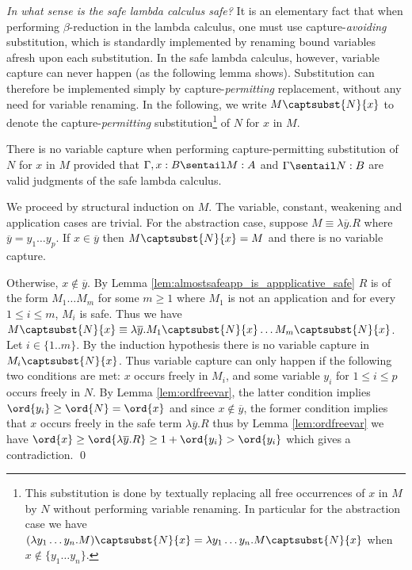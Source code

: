 \emph{In what sense is the safe lambda calculus safe?} It is an
elementary fact that when performing $\beta$-reduction in the lambda
calculus, one must use capture-\emph{avoiding} substitution, which
is standardly implemented by renaming bound variables afresh upon
each substitution. In the safe lambda calculus, however, variable
capture can never happen (as the following lemma shows).
Substitution can therefore be implemented simply by
capture-\emph{permitting} replacement, without any need for variable
renaming. In the following, we write $M\captsubst{N}{x}$ to denote
the capture-\emph{permitting} substitution\footnote{This
substitution is done by textually replacing all free occurrences of
$x$ in $M$ by $N$ without performing variable renaming.  In
particular for the abstraction
  case we have
$(\lambda y_1\ldots y_n . M)\captsubst{N}{x} = \lambda y_1\ldots y_n . M\captsubst{N}{x}$ when $x\not\in
  \{ y_1\ldots y_n \}$.}
of $N$ for $x$ in $M$.

\begin{lemma}\label{lem:nvc}
\label{lem:nocapture} There is no variable capture when performing
capture-permitting substitution of $N$ for $x$ in $M$ provided that
$\Gamma, x:B \sentail M : A$ and $\Gamma \sentail  N : B$ are valid
judgments of the safe lambda calculus.
\end{lemma}

\proof
  We proceed by structural induction on $M$. The variable, constant, weakening and
  application cases are trivial. For the abstraction case, suppose $M \equiv \lambda \overline{y}. R$ where $\overline{y} = y_1 \ldots y_p$. If $x \in \overline{y}$ then $M \captsubst{N}{x} = M$ and there is no variable capture.

 Otherwise, $x \not\in \overline{y}$. By Lemma \ref{lem:almostsafeapp_is_appplicative_safe} $R$ is of the
  form $M_1 \ldots M_m$ for some $m\geq 1$ where $M_1$ is not an application and for every $1 \leq i\leq m$, $M_i$ is safe.
 Thus we have $M \captsubst{N}{x} \equiv \lambda \overline{y} . M_1 \captsubst{N}{x} \ldots M_m \captsubst{N}{x}$.  Let $i\in\{1..m\}$. By the induction hypothesis there is no variable capture in $M_i \captsubst{N}{x}$.  Thus variable capture can only happen if the following two conditions are met: $x$ occurs freely in $M_i$, and some variable $y_i$ for $1 \leq i \leq p$ occurs freely in $N$. By Lemma \ref{lem:ordfreevar}, the latter condition implies $\ord{y_i} \geq \ord{N} = \ord{x}$ and  since $x \not \in \overline{y}$, the former condition implies that $x$ occurs freely in the safe term $\lambda \overline{y}. R$
  thus by Lemma \ref{lem:ordfreevar} we have $ \ord{x} \geq
  \ord{\lambda \overline{y} . R} \geq 1+ \ord{y_i} > \ord{y_i}$ which  gives a contradiction.
\qed


